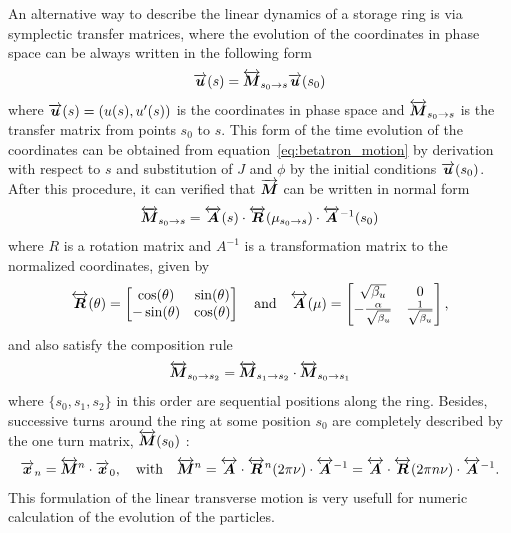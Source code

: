 	An alternative way to describe the linear dynamics of a storage ring is via symplectic transfer matrices, where the evolution of the coordinates in phase space can be always written in the following form
	\begin{align}
		\overrightarrow{\boldsymbol{u}}(s) = \overleftrightarrow{\boldsymbol{M}}_{s_0\to s} \overrightarrow{\boldsymbol{u}}(s_0)
	\end{align}
	where $\overrightarrow{\boldsymbol{u}}(s) = \left(u(s), u'(s)\right)$ is the coordinates in phase space and  $\overleftrightarrow{\boldsymbol{M}}_{s_0\to s}$ is the transfer matrix from points $s_0$ to $s$. This form of the time evolution of the coordinates can be obtained from equation~\eqref{eq:betatron_motion} by derivation with respect to $s$ and substitution of $J$ and $\phi$ by the initial conditions $\overrightarrow{\boldsymbol{u}}(s_0)$. After this procedure, it can verified that $\overrightarrow{\boldsymbol{M}}$ can be written in normal form~\cite{Bengtsson1997}
	\begin{align}
		\overleftrightarrow{\boldsymbol{M}}_{s_0\to s} = \overleftrightarrow{\boldsymbol{A}}(s)\cdot\overleftrightarrow{\boldsymbol{R}}(\mu_{s_0\to s})\cdot\overleftrightarrow{\boldsymbol{A}}^{-1}(s_0)
	\end{align}
	where $R$ is a rotation matrix and $A^{-1}$ is a transformation matrix to the normalized coordinates, given by
	\begin{align}
		\overleftrightarrow{\boldsymbol{R}}(\theta) =
				\begin{bmatrix}
					\cos(\theta)  & \sin(\theta)\\
					-\sin(\theta) & \cos(\theta)
				\end{bmatrix}
				\quad\text{and}\quad
		\overleftrightarrow{\boldsymbol{A}}(\mu) =
				\begin{bmatrix}
					\sqrt{\beta_u}                 & 0\\
					-\frac{\alpha}{\sqrt{\beta_u}} & \frac{1}{\sqrt{\beta_u}}
				\end{bmatrix},
	\end{align}
	and also satisfy the composition rule
	\begin{align}
		\overleftrightarrow{\boldsymbol{M}}_{s_0\to s_2} = \overleftrightarrow{\boldsymbol{M}}_{s_1\to s_2}\cdot\overleftrightarrow{\boldsymbol{M}}_{s_0\to s_1}
	\end{align}
	where $\{s_0, s_1, s_2\}$ in this order are sequential positions along the ring. Besides, successive turns around the ring at some position $s_0$ are completely described by the one turn matrix, $\overleftrightarrow{\boldsymbol{M}}(s_0)$ :
	\begin{align}
		\overrightarrow{\boldsymbol{x}}_n = \overleftrightarrow{\boldsymbol{M}}^n \cdot \overrightarrow{\boldsymbol{x}}_0, \quad \text{with} \quad
		\overleftrightarrow{\boldsymbol{M}}^n = \overleftrightarrow{\boldsymbol{A}}\cdot\overleftrightarrow{\boldsymbol{R}}^n(2\pi\nu)\cdot\overleftrightarrow{\boldsymbol{A}}^{-1} =
					    \overleftrightarrow{\boldsymbol{A}}\cdot\overleftrightarrow{\boldsymbol{R}}(2\pi n \nu)\cdot\overleftrightarrow{\boldsymbol{A}}^{-1}.
	\end{align}
    This formulation of the linear transverse motion is very usefull for numeric calculation of the evolution of the particles.


